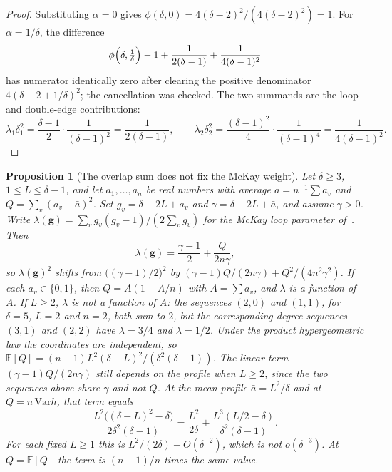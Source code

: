 \documentclass[11pt]{article}
\newtheorem{proposition}[theorem]{Proposition}
\newcommand{\EE}{\mathbb{E}}
\newcommand{\Var}{\mathrm{Var}}
\begin{document}
\begin{proof}
Substituting \(\alpha=0\) gives
\(\phi(\delta,0)=4(\delta-2)^2/(4(\delta-2)^2)=1\).
For \(\alpha=1/\delta\), the difference
\[
\phi\Bigl(\delta,\tfrac1\delta\Bigr)
-1+\frac1{2(\delta-1)}+\frac1{4(\delta-1)^2}
\]
has numerator identically zero after clearing the positive denominator
\(4(\delta-2+1/\delta)^2\); the cancellation was checked.
The two summands are the loop and double-edge contributions:
\[
\lambda_1\delta_1^2=\frac{\delta-1}{2}\cdot\frac1{(\delta-1)^2}=\frac1{2(\delta-1)},
\qquad
\lambda_2\delta_2^2=\frac{(\delta-1)^2}{4}\cdot\frac1{(\delta-1)^4}
=\frac1{4(\delta-1)^2}.
\]
\end{proof}

\begin{proposition}[The overlap sum does not fix the McKay weight]
\label{prop:overlap-not-weight}
Let \(\delta\ge 3\), \(1\le L\le\delta-1\), and let \(a_1,\ldots,a_n\) be real numbers
with average \(\bar a=n^{-1}\sum a_v\) and
\(Q=\sum_v(a_v-\bar a)^2\). Set \(g_v=\delta-2L+a_v\) and
\(\gamma=\delta-2L+\bar a\), and assume \(\gamma>0\). Write
\(\lambda(\boldsymbol g)=\sum_v g_v(g_v-1)/(2\sum_v g_v)\) for the McKay
loop parameter of~\cite[Theorem~14]{Gao21}. Then
\[
\lambda(\boldsymbol g)=\frac{\gamma-1}{2}+\frac{Q}{2n\gamma},
\]
so \(\lambda(\boldsymbol g)^2\) shifts from \(\bigl((\gamma-1)/2\bigr)^2\) by
\((\gamma-1)Q/(2n\gamma)+Q^2/(4n^2\gamma^2)\).
If each \(a_v\in\{0,1\}\), then \(Q=A(1-A/n)\) with \(A=\sum a_v\), and
\(\lambda\) is a function of \(A\).
If \(L\ge 2\), \(\lambda\) is not a function of \(A\): the sequences
\((2,0)\) and \((1,1)\), for \(\delta=5\), \(L=2\) and \(n=2\), both sum to
\(2\), but the corresponding degree sequences \((3,1)\) and \((2,2)\) have
\(\lambda=3/4\) and \(\lambda=1/2\).
Under the product hypergeometric law the coordinates are independent, so
\(\EE[Q]=(n-1)L^2(\delta-L)^2/(\delta^2(\delta-1))\).
The linear term \((\gamma-1)Q/(2n\gamma)\) still depends on the profile when
\(L\ge 2\), since the two sequences above share \(\gamma\) and not \(Q\).
At the mean profile \(\bar a=L^2/\delta\) and at \(Q=n\,\Var h\), that term equals
\[
\frac{L^2\bigl((\delta-L)^2-\delta\bigr)}{2\delta^2(\delta-1)}
=
\frac{L^2}{2\delta}+\frac{L^3(L/2-\delta)}{\delta^2(\delta-1)}.
\]
For each fixed \(L\ge 1\) this is \(L^2/(2\delta)+O(\delta^{-2})\), which is
not \(o(\delta^{-3})\). At \(Q=\EE[Q]\) the term is \((n-1)/n\) times the
same value.
\end{proposition}
\end{document}
